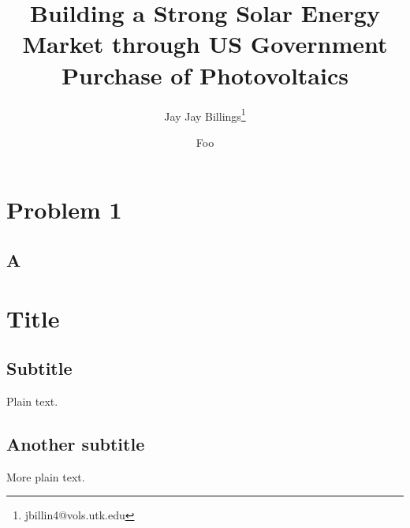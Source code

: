 \documentclass{article}
\begin{document}
\title{Building a Strong Solar Energy Market through US Government Purchase of
Photovoltaics}
\author{Jay Jay Billings\footnote{jbillin4@vols.utk.edu}}
\author{Foo}
\maketitle


\section*{Problem 1}

\subsection*{A}

\section{Title}

\subsection{Subtitle}

Plain text.

\subsection{Another subtitle}

More plain text.
\end{document}
